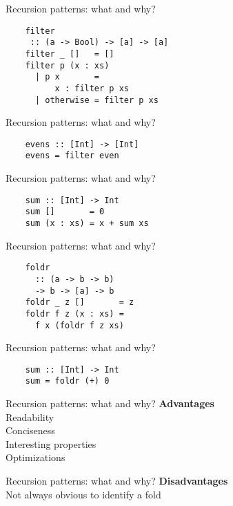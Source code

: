 \documentclass[20pt]{beamer}
\begin{document}
\begin{frame}[fragile]{Recursion patterns: what and why?}
    \begin{lstlisting}
    filter
     :: (a -> Bool) -> [a] -> [a]
    filter _ []   = []
    filter p (x : xs)
      | p x       =
          x : filter p xs
      | otherwise = filter p xs
    \end{lstlisting}
\end{frame}

\begin{frame}[fragile]{Recursion patterns: what and why?}
    \begin{lstlisting}
    evens :: [Int] -> [Int]
    evens = filter even
    \end{lstlisting}
\end{frame}

\begin{frame}[fragile]{Recursion patterns: what and why?}
    \begin{lstlisting}
    sum :: [Int] -> Int
    sum []       = 0
    sum (x : xs) = x + sum xs
    \end{lstlisting}
\end{frame}

\begin{frame}[fragile]{Recursion patterns: what and why?}
    \begin{lstlisting}
    foldr
      :: (a -> b -> b)
      -> b -> [a] -> b
    foldr _ z []       = z
    foldr f z (x : xs) =
      f x (foldr f z xs)
    \end{lstlisting}
\end{frame}

\begin{frame}[fragile]{Recursion patterns: what and why?}
    \begin{lstlisting}
    sum :: [Int] -> Int
    sum = foldr (+) 0
    \end{lstlisting}
\end{frame}

\begin{frame}{Recursion patterns: what and why?}
    \textbf{Advantages} \\
    Readability \\
    Conciseness \\
    Interesting properties \\
    Optimizations \\
\end{frame}

\begin{frame}{Recursion patterns: what and why?}
    \textbf{Disadvantages} \\
    Not always obvious to identify a fold
\end{frame}
\end{document}

